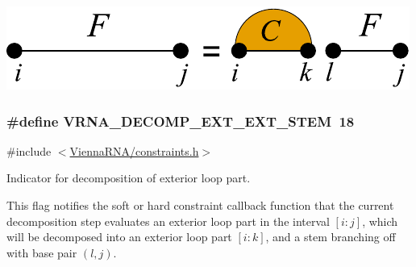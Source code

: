  
\begin{DoxyImageNoCaption}
  \mbox{\includegraphics[width=\textwidth,height=\textheight/2,keepaspectratio=true]{decomp_ext_stem_ext}}
\end{DoxyImageNoCaption}
 \hypertarget{group__constraints_ga06efd054c9271438f6d82d4559d9e69f}{}
\subsubsection[{V\+R\+N\+A\+\_\+\+D\+E\+C\+O\+M\+P\+\_\+\+E\+X\+T\+\_\+\+E\+X\+T\+\_\+\+S\+T\+E\+M}]{\setlength{\rightskip}{0pt plus 5cm}\#define V\+R\+N\+A\+\_\+\+D\+E\+C\+O\+M\+P\+\_\+\+E\+X\+T\+\_\+\+E\+X\+T\+\_\+\+S\+T\+E\+M~18}\label{group__constraints_ga06efd054c9271438f6d82d4559d9e69f}


{\ttfamily \#include $<$\hyperlink{constraints_8h}{Vienna\+R\+N\+A/constraints.\+h}$>$}



Indicator for decomposition of exterior loop part. 

This flag notifies the soft or hard constraint callback function that the current decomposition step evaluates an exterior loop part in the interval $[i:j]$, which will be decomposed into an exterior loop part $[i:k]$, and a stem branching off with base pair $(l,j)$.

